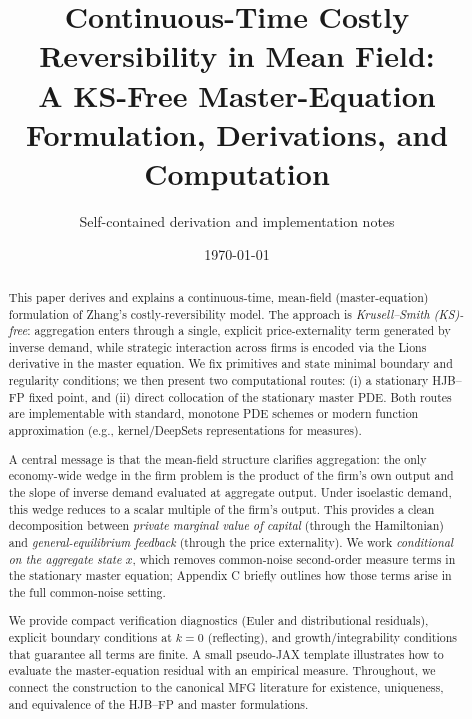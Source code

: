 \documentclass[11pt,letterpaper,oneside]{article}
\title{\vspace{-1.5em}Continuous-Time Costly Reversibility in Mean Field:\\
A KS-Free Master-Equation Formulation, Derivations, and Computation}
\author{%
\small Self-contained derivation and implementation notes
}
\date{\small \today}
\numberwithin{equation}{section}
\newcommand{\ac}[1]{\textsc{#1}}
\newcommand{\1}{\mathbf{1}}
\begin{document}
\maketitle

\begin{abstract}
\noindent
This paper derives and explains a continuous-time, mean-field (master-equation) formulation of Zhang's costly-reversibility model. The approach is \emph{Krusell--Smith (KS)-free}: aggregation enters through a single, explicit price-externality term generated by inverse demand, while strategic interaction across firms is encoded via the Lions derivative in the master equation. We fix primitives and state minimal boundary and regularity conditions; we then present two computational routes: (i) a stationary \ac{HJB}--\ac{FP} fixed point, and (ii) direct collocation of the stationary master \ac{PDE}. Both routes are implementable with standard, monotone PDE schemes or modern function approximation (e.g., kernel/DeepSets representations for measures).

A central message is that the mean-field structure clarifies aggregation: the only economy-wide wedge in the firm problem is the product of the firm's own output and the slope of inverse demand evaluated at aggregate output. Under isoelastic demand, this wedge reduces to a scalar multiple of the firm's output. This provides a clean decomposition between \emph{private marginal value of capital} (through the Hamiltonian) and \emph{general-equilibrium feedback} (through the price externality). We work \emph{conditional on the aggregate state $x$}, which removes common-noise second-order measure terms in the stationary master equation; Appendix C briefly outlines how those terms arise in the full common-noise setting.

We provide compact verification diagnostics (Euler and distributional residuals), explicit boundary conditions at $k=0$ (reflecting), and growth/integrability conditions that guarantee all terms are finite. A small pseudo-JAX template illustrates how to evaluate the master-equation residual with an empirical measure. Throughout, we connect the construction to the canonical \ac{MFG} literature for existence, uniqueness, and equivalence of the \ac{HJB}--\ac{FP} and master formulations.
\end{abstract}

\tableofcontents

\end{document}
